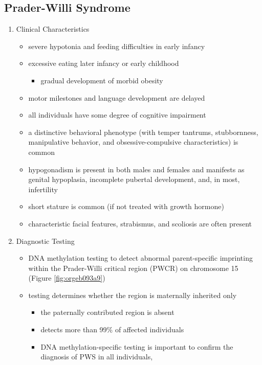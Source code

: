 \documentclass[12pt]{scrartcl}
\begin{document}
\subsection{Prader-Willi Syndrome}
\label{sec:orgb624d02}
\begin{enumerate}
\item Clinical Characteristics
\label{sec:org8ee370d}
\begin{itemize}
\item severe hypotonia and feeding difficulties in early infancy
\item excessive eating later infancy or early childhood
\begin{itemize}
\item gradual development of morbid obesity
\end{itemize}
\item motor milestones and language development are delayed
\item all individuals have some degree of cognitive impairment
\item a distinctive behavioral phenotype (with temper tantrums,
stubbornness, manipulative behavior, and obsessive-compulsive
characteristics) is common
\item hypogonadism is present in both males and females and manifests as
genital hypoplasia, incomplete pubertal development, and, in most,
infertility
\item short stature is common (if not treated with growth hormone)
\item characteristic facial features, strabismus, and scoliosis are often
present
\end{itemize}

\item Diagnostic Testing
\label{sec:org7926776}
\begin{itemize}
\item DNA methylation testing to detect abnormal parent-specific
imprinting within the Prader-Willi critical region (PWCR) on
chromosome 15 (Figure \ref{fig:orgeb093a9})
\item testing determines whether the region is maternally inherited only
\begin{itemize}
\item the paternally contributed region is absent
\item detects more than 99\% of affected individuals
\item DNA methylation-specific testing is important to confirm the
diagnosis of PWS in all individuals,
\end{itemize}
\end{itemize}


\end{enumerate}
\end{document}
